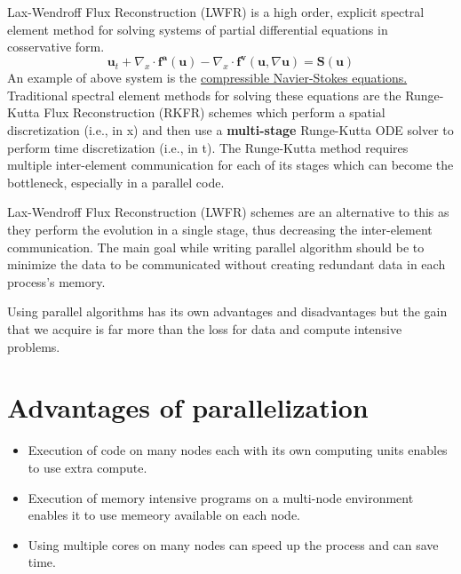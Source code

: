 Lax-Wendroff Flux Reconstruction (LWFR) is a high order, explicit spectral element method for solving systems of partial differential equations in cosservative form. 
\begin{equation}
    \boldsymbol{u}_t + \nabla_x \cdot \boldsymbol{f^a(u)} - \nabla_x \cdot \boldsymbol{f^v}(\boldsymbol{u},\nabla \boldsymbol{u}) = \boldsymbol{S(u)}
\end{equation}
An example of above system is the \href{https://en.wikipedia.org/wiki/Navier%E2%80%93Stokes_equations}{compressible Navier-Stokes equations.} Traditional spectral element methods for solving these equations are the Runge-Kutta Flux Reconstruction (RKFR) schemes which perform a spatial discretization (i.e., in x) and then use a \textbf{multi-stage} Runge-Kutta ODE solver to perform time discretization (i.e., in t). The Runge-Kutta method requires multiple inter-element communication for each of its stages which can become the bottleneck, especially in a parallel code.  

Lax-Wendroff Flux Reconstruction (LWFR) schemes are an alternative to this as they perform the evolution in a single stage, thus decreasing the inter-element communication. The main goal while writing parallel algorithm should be to minimize the data to be communicated without creating redundant data in each process's memory. 

Using parallel algorithms has its own advantages and disadvantages but the gain that we acquire is far more than the loss for data and compute intensive problems.
\section{Advantages of parallelization}
\begin{itemize}
    \item Execution of code on many nodes each with its own computing units enables to use extra compute.
    \item Execution of memory intensive programs on a multi-node environment enables it to use memeory available on each node.
    \item Using multiple cores on many nodes can speed up the process and can save time.
\end{itemize}

